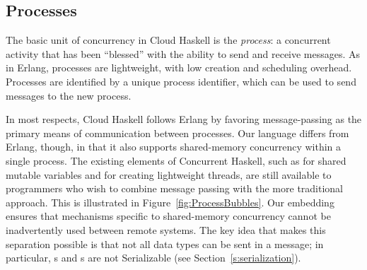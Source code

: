 \documentclass{sigplanconf}
\begin{document}
\subsection{Processes}
\label{s:processes}

The basic unit of concurrency in Cloud Haskell is the {\em process}:  a concurrent activity that has been ``blessed'' with the ability to send and receive messages. As in Erlang, processes are lightweight, with low creation and scheduling overhead.  Processes are identified by a unique process identifier, which can be used to send messages to the new process.

In most respects, Cloud Haskell follows Erlang by favoring message-passing as the primary means of communication between processes. Our language differs from Erlang, though, in that it also supports shared-memory concurrency within a single process. The existing elements of Concurrent Haskell, such as  for shared mutable variables and  for creating lightweight threads, are still available to programmers who wish to combine message passing with the more traditional approach. This is illustrated in Figure~\ref{fig:ProcessBubbles}. Our embedding ensures that mechanisms specific to shared-memory concurrency cannot be inadvertently used between remote systems.  The key idea that makes this separation possible is that not all data types can be sent in a message; in particular, s and s are not Serializable (see Section~\ref{s:serialization}).
\end{document}
